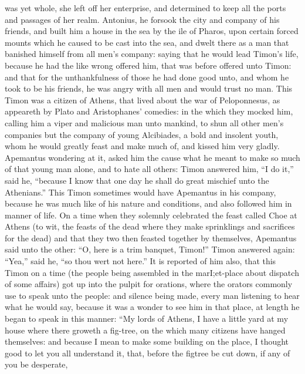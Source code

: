 \documentclass{book}
\begin{document}
was yet whole, she left off her enterprise, and determined to keep
all the ports and passages of her realm. Antonius,
he forsook the city and company of his friends, and built him a house
in the sea by the ile of Pharos, upon certain forced mounts which he
caused to be cast into the sea, and dwelt there as a man that banished
himself from all men's company: saying that he would lead Timon's
life,  because he had the like wrong offered him, that was before
offered unto Timon: and that for the unthankfulness of those he had
done good unto, and whom he took to be his friends, he was angry with
all men and would trust no man.
This Timon was a citizen of Athens, that lived about the war of
Peloponnesus, as appeareth by Plato  and Aristophanes'
comedies: in the which they mocked him, calling him a viper and
malicious man unto mankind, to shun all other men's companies but the
company of young Alcibiades, a bold and insolent youth, whom he would
greatly feast and make much of, and kissed him very gladly. Apemantus
wondering at it, asked him the cause what he meant to make so much
of that young man alone, and to hate all others: Timon answered
him, ``I do it,'' said he, ``because I know that one day he shall do
great mischief unto the Athenians.'' This Timon sometimes would have
Apemantus in his company, because he was much like of his nature and
conditions, and also followed him in manner of life. On a time when
they solemnly celebrated the feast called Choe at Athens (to wit,
the feasts of the dead where they make sprinklings and sacrifices
for the dead) and that they two then feasted together by themselves,
Apemantus said unto the other: ``O, here is a trim banquet, Timon!''
Timon answered again: ``Yea,'' said he, ``so thou wert not here.'' It
is reported of him also, that this Timon on a time (the people being
assembled in the marI;et-place about dispatch of some affairs) got up
into the pulpit for orations, where the orators commonly use to speak
unto the people: and silence being made, every man listening to hear
what he would say, because it was a wonder to see him in that place,
at length he began to speak in this manner: ``My lords of Athens, I
have a little yard at my house where there groweth a fig-tree, on the
which many citizens have hanged themselves: and because I mean to make
some building on the place, I thought good to let you all understand
it, that, before the figtree be cut down, if any of you be desperate,
\end{document}
